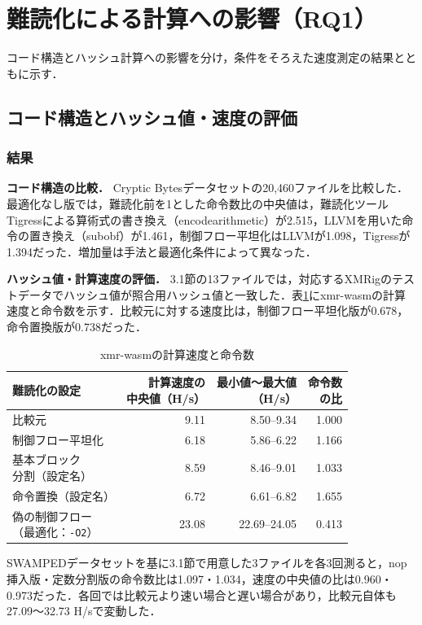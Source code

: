 \documentclass[submit,techrep]{ipsj}
\begin{document}
\section{難読化による計算への影響（RQ1）}
コード構造とハッシュ計算への影響を分け，条件をそろえた速度測定の結果とともに示す．
\subsection{コード構造とハッシュ値・速度の評価}
\subsubsection{結果}
\noindent\textbf{コード構造の比較．}
Cryptic Bytesデータセットの20,460ファイルを比較した．最適化なし版では，難読化前を1とした命令数比の中央値は，難読化ツールTigressによる算術式の書き換え（encodearithmetic）が2.515，LLVMを用いた命令の置き換え（subobf）が1.461，制御フロー平坦化はLLVMが1.098，Tigressが1.394だった．増加量は手法と最適化条件によって異なった．

\noindent\textbf{ハッシュ値・計算速度の評価．}
3.1節の13ファイルでは，対応するXMRigのテストデータでハッシュ値が照合用ハッシュ値と一致した．表\ref{tab:xmr-runtime}にxmr-wasmの計算速度と命令数を示す．比較元に対する速度比は，制御フロー平坦化版が0.678，命令置換版が0.738だった．
\begin{table}[t]
\centering\small
\caption{xmr-wasmの計算速度と命令数}
\label{tab:xmr-runtime}
\setlength{\tabcolsep}{2.8pt}
\begin{tabular}{lrrr}
\hline
難読化の設定 & \shortstack{計算速度の\\中央値（H/s）} & \shortstack{最小値～最大値\\（H/s）} & \shortstack{命令数\\の比} \\
\hline
比較元 & 9.11 & 8.50--9.34 & 1.000 \\
制御フロー平坦化 & 6.18 & 5.86--6.22 & 1.166 \\
\shortstack[l]{基本ブロック\\分割（設定名）} & 8.59 & 8.46--9.01 & 1.033 \\
命令置換（設定名） & 6.72 & 6.61--6.82 & 1.655 \\
\shortstack[l]{偽の制御フロー\\（最適化：\texttt{-O2}）} & 23.08 & 22.69--24.05 & 0.413 \\
\hline
\end{tabular}
\end{table}
SWAMPEDデータセットを基に3.1節で用意した3ファイルを各3回測ると，nop挿入版・定数分割版の命令数比は1.097・1.034，速度の中央値の比は0.960・0.973だった．各回では比較元より速い場合と遅い場合があり，比較元自体も27.09～32.73 H/sで変動した．
\end{document}
